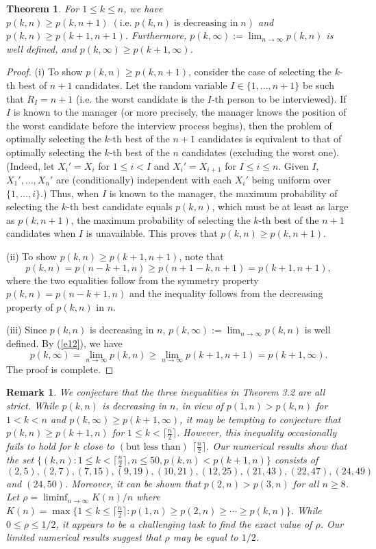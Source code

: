 \documentclass[12pt, A4paper, oneside]{article}
\theoremstyle{plain}
\newtheorem{thm}{Theorem}[section]
\newtheorem{rem}{Remark}[section]
\numberwithin{equation}{section}
\begin{document}
\begin{thm}
For $1\le k \le n$, we have $p(k,n)\ge p(k,n+1)\; (\mbox{i.e.}\; p(k,n) \;\mbox{is decreasing in}\; n)$ and $p(k,n)\ge p(k+1,n+1)$. Furthermore,
$p(k,\infty):=\lim_{n \to \infty} p(k,n)$ is well defined, and $p(k,\infty)\ge p(k+1,\infty)$.
\end{thm}
\begin{proof}
(i) To show $p(k,n)\ge p(k,n+1)$, consider the case of selecting the $k$-th best of $n+1$ candidates. Let
the random variable $I \in \{1,\dots, n+1\}$ be such that $R_I=n+1$ (i.e. the worst candidate is the $I$-th person to be interviewed). If $I$ is known to the manager (or more precisely, the manager knows the position of the worst candidate before the interview process begins), then
the problem of optimally selecting the $k$-th best of the $n+1$ candidates is equivalent  to that of optimally
selecting the $k$-th best of the $n$ candidates (excluding the worst one).
(Indeed, let $X_i'=X_i$ for $1\le i<I$ and $X_i'=X_{i+1}$ for $I\le i\le n$. Given $I$, $X_1',\dots, X_n'$ are (conditionally) independent
with each $X_i'$ being uniform over $\{1,\dots,i\}$.)
Thus, when $I$ is known to the manager,
the maximum probability
of selecting the $k$-th best candidate equals $p(k,n)$, which must be at least as large as $p(k,n+1)$, the maximum probability
of selecting the $k$-th best of the $n+1$ candidates when  $I$ is unavailable. This proves that $p(k,n)\ge p(k,n+1)$.


(ii) To show $p(k,n)\ge p(k+1,n+1)$, note that
\begin{equation}
p(k,n)=p(n-k+1,n)\ge p(n+1-k,n+1)=p(k+1,n+1),\label{e12}
\end{equation}
where the two equalities follow from the symmetry property $p(k,n)=p(n-k+1,n)$ and the inequality follows from
the decreasing property of $p(k,n)$ in $n$.

(iii) Since $p(k,n)$ is decreasing in $n$, $p(k,\infty):=\lim_{n \to \infty} p(k,n)$ is well defined.
By (\ref{e12}), we have
$$
p(k,\infty)=\lim_{n\to\infty}p(k,n)\ge\lim_{n\to\infty}p(k+1,n+1)=p(k+1,\infty).
$$
The proof is complete.
\end{proof}
\begin{rem}
We conjecture that the three inequalities in Theorem 3.2 are all strict.  While $p(k,n)$ is decreasing in $n$,
in view of $p(1,n)>p(k,n)$ for $1<k<n$ and $p(k,\infty)\ge p(k+1,\infty)$, it may be tempting to conjecture that $p(k,n)\ge p(k+1,n)$
for $1\le k <\lceil\frac{n}{2}\rceil$. However, this inequality occasionally fails to hold for $k$ close to $(\mbox{but less than})$ $\lceil\frac{n}{2}\rceil$.
Our numerical results show that the set  $\{(k,n): 1\le k <\lceil\frac{n}{2}\rceil, n\le 50, p(k,n)<p(k+1,n)\}$ consists of $(2,5),(2,7),(7,15),(9,19),(10,21),(12,25),(21,43),(22,47),(24,49)$ and $(24,50)$.
Moreover, it can be shown that $p(2,n)>p(3,n)$ for all $n\ge 8$.  Let $\rho=\liminf_{n \to \infty} K(n)/n$
  where $K(n)=\max\{1\le k \le \lceil\frac{n}{2}\rceil: p(1,n)\ge p(2,n)\ge \cdots \ge p(k,n)\}$. While $0\le \rho \le 1/2$, it appears to be a
  challenging task to find the exact value of $\rho$. Our limited
  numerical results suggest that $\rho$ may be equal to $1/2$.
\end{rem}
\end{document}
